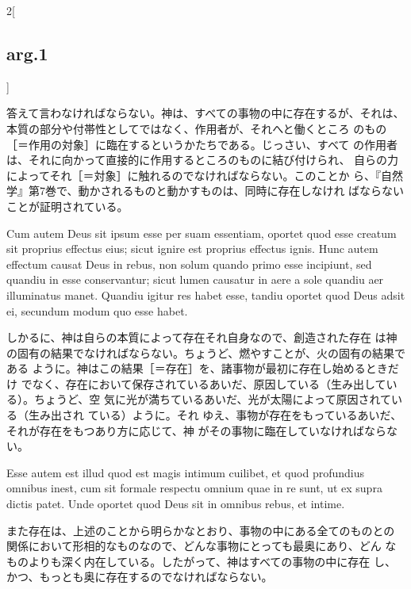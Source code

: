 \documentclass[paper=a4paper,fontsize=10pt,jafontsize=9pt,titlepage]{jlreq}
\begin{document}
\begin{paracol}{2}[\subsection{arg.1}]
\switchcolumn

答えて言わなければならない。神は、すべての事物の中に存在するが、それは、
 本質の部分や付帯性としてではなく、作用者が、それへと働くところ
 のもの［＝作用の対象］に臨在するというかたちである。じっさい、すべて
 の作用者は、それに向かって直接的に作用するところのものに結び付けられ、
 自らの力によってそれ［＝対象］に触れるのでなければならない。このことか
 ら、『自然学』第7巻で、動かされるものと動かすものは、同時に存在しなけれ
 ばならないことが証明されている。

\switchcolumn*

Cum autem Deus sit ipsum esse per suam essentiam, oportet quod
 esse creatum sit proprius effectus eius; sicut ignire est proprius
 effectus ignis. Hunc autem effectum causat Deus in rebus, non solum
 quando primo esse incipiunt, sed quandiu in esse conservantur; sicut
 lumen causatur in aere a sole quandiu aer illuminatus manet. Quandiu
 igitur res habet esse, tandiu oportet quod Deus adsit ei, secundum
 modum quo esse habet.

\switchcolumn

しかるに、神は自らの本質によって存在それ自身なので、創造された存在
 は神の固有の結果でなければならない。ちょうど、燃やすことが、火の固有の結果である
 ように。神はこの結果［＝存在］を、諸事物が最初に存在し始めるときだけ
 でなく、存在において保存されているあいだ、原因している（生み出してい
 る）。ちょうど、空
 気に光が満ちているあいだ、光が太陽によって原因されている（生み出され
 ている）ように。それ
 ゆえ、事物が存在をもっているあいだ、それが存在をもつあり方に応じて、神
 がその事物に臨在していなければならない。

\switchcolumn*

Esse autem est illud quod est magis intimum cuilibet, et quod
 profundius omnibus inest, cum sit formale respectu omnium quae in re
 sunt, ut ex supra dictis patet. Unde oportet quod Deus sit in omnibus
 rebus, et intime.

\switchcolumn

また存在は、上述のことから明らかなとおり、事物の中にある全てのものとの
 関係において形相的なものなので、どんな事物にとっても最奥にあり、どん
 なものよりも深く内在している。したがって、神はすべての事物の中に存在
 し、かつ、もっとも奥に存在するのでなければならない。

\switchcolumn*[\subsection{ad.1}]


\end{paracol}
\end{document}
